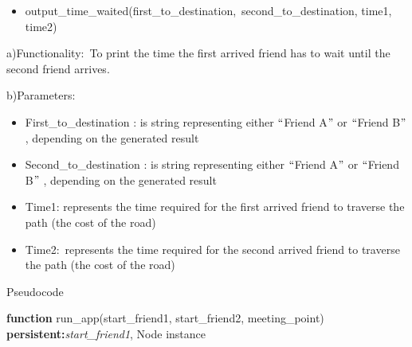 \documentclass[12pt]{article}
\begin{document}
\vspace{\baselineskip}\begin{itemize}
	\item output\_time\_waited(first\_to\_destination,\ second\_to\_destination,  time1, time2) 
\end{itemize}\par

\begin{justify}
 \tabto{0.75in} a)\tab Functionality:\ To print the time the first arrived friend has to wait until the second friend arrives.  
\end{justify}\par

\begin{justify}
 \tabto{0.75in}  b)\tab Parameters:
\end{justify}\par

\begin{itemize}
	\item First\_to\_destination : is string representing either $``$Friend A$"$  or $``$Friend B$"$ , depending on the generated result\par

	\item Second\_to\_destination : is string representing either $``$Friend A$"$  or $``$Friend B$"$ , depending on the generated result\par

	\item Time1: represents the time required for the first arrived friend to traverse the path (the cost of the road)\par

	\item Time2:\  represents the time required for the second arrived friend to traverse the path (the cost of the road)
\end{itemize}\par

\begin{justify}
{\fontsize{14pt}{16.8pt}\selectfont Pseudocode\par}
\end{justify}\par

\begin{adjustwidth}{0.5in}{0.0in}
\begin{justify}
{\fontsize{8pt}{9.6pt}\selectfont \textbf{function} run\_app(start\_friend1, start\_friend2, meeting\_point) \tabto{0.75in} \tab \tab \tab \tab \textbf{persistent:}\textit{start\_friend1}, Node instance\par}
\end{justify}\par

\end{adjustwidth}
\end{document}
